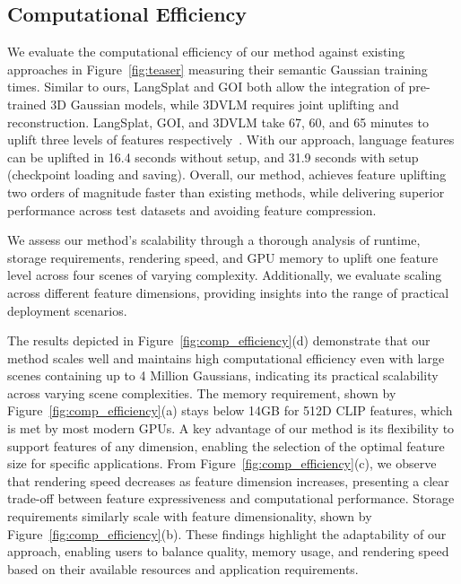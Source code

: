 

\subsection{Computational Efficiency}
We evaluate the computational efficiency of our method against existing approaches in Figure~\ref{fig:teaser} measuring their semantic Gaussian training times. Similar to ours, LangSplat and GOI both allow the integration of pre-trained 3D Gaussian models, while 3DVLM requires joint uplifting and reconstruction. %
LangSplat, GOI, and 3DVLM take 67, 60, and 65 minutes to uplift three levels of features respectively~\cite{peng20243dvisionlanguagegaussiansplatting}. With our approach, language features can be uplifted in 16.4 seconds without setup, and 31.9 seconds with setup (checkpoint loading and saving).
Overall, our method, achieves feature uplifting two orders of magnitude faster than existing methods, while delivering superior performance across test datasets and avoiding feature compression.

We assess our method's scalability through a thorough analysis of runtime, storage requirements, rendering speed, and GPU memory to uplift one feature level across four scenes of varying complexity. Additionally, we evaluate scaling across different feature dimensions, providing insights into the range of practical deployment scenarios.

The results depicted in Figure~\ref{fig:comp_efficiency}(d) demonstrate that our method scales well and maintains high computational efficiency even with large scenes containing up to 4 Million Gaussians, indicating its practical scalability across varying scene complexities. The memory requirement, shown by Figure~\ref{fig:comp_efficiency}(a) stays below 14GB for 512D CLIP features, which is met by most modern GPUs.  A key advantage of our method is its flexibility to support features of any dimension, enabling the selection of the optimal feature size for specific applications. From Figure~\ref{fig:comp_efficiency}(c), we observe that rendering speed decreases as feature dimension increases, presenting a clear trade-off between feature expressiveness and computational performance. Storage requirements similarly scale with feature dimensionality, shown by Figure~\ref{fig:comp_efficiency}(b). These findings highlight the adaptability of our approach, enabling users to balance quality, memory usage, and rendering speed based on their available resources and application requirements.


